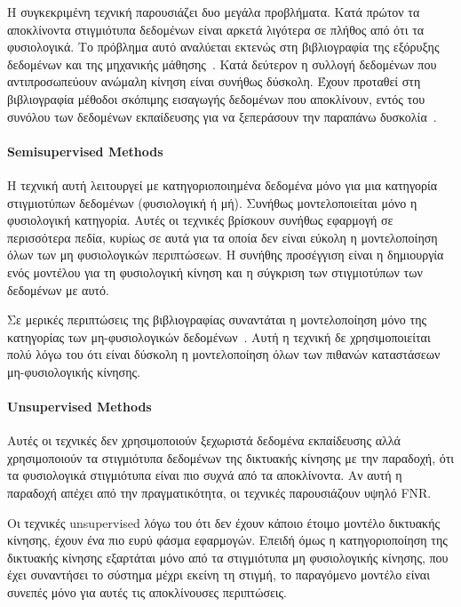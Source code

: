 \documentclass[12pt]{report}
\begin{document}
Η συγκεκριμένη τεχνική παρουσιάζει δυο μεγάλα προβλήματα. Κατά πρώτον τα αποκλίνοντα στιγμιότυπα δεδομένων είναι αρκετά λιγότερα σε πλήθος από ότι τα φυσιολογικά. Το πρόβλημα αυτό αναλύεται εκτενώς στη βιβλιογραφία της εξόρυξης δεδομένων και της μηχανικής μάθησης~\cite{paper:14}. Κατά δεύτερον η συλλογή δεδομένων που αντιπροσωπεύουν ανώμαλη κίνηση είναι συνήθως δύσκολη. Έχουν προταθεί στη βιβλιογραφία μέθοδοι σκόπιμης εισαγωγής δεδομένων που αποκλίνουν, εντός του συνόλου των δεδομένων εκπαίδευσης για να ξεπεράσουν την παραπάνω δυσκολία~\cite{paper:14}.

\paragraph{\textlatin{Semisupervised Methods}} Η τεχνική αυτή λειτουργεί με κατηγοριοποιημένα δεδομένα μόνο για μια κατηγορία στιγμιοτύπων δεδομένων (φυσιολογική ή μή). Συνήθως μοντελοποιείται μόνο η φυσιολογική κατηγορία. Αυτές οι τεχνικές βρίσκουν συνήθως εφαρμογή σε περισσότερα πεδία, κυρίως σε αυτά για τα οποία δεν είναι εύκολη η μοντελοποίηση όλων των μη φυσιολογικών περιπτώσεων. Η συνήθης προσέγγιση είναι η δημιουργία ενός μοντέλου για τη φυσιολογική κίνηση και η σύγκριση των στιγμιοτύπων των δεδομένων με αυτό.

Σε μερικές περιπτώσεις της βιβλιογραφίας συναντάται η μοντελοποίηση μόνο της κατηγορίας των μη-φυσιολογικών δεδομένων~\cite{paper:14}. Αυτή η τεχνική δε χρησιμοποιείται πολύ λόγω του ότι είναι δύσκολη η μοντελοποίηση όλων των πιθανών καταστάσεων μη-φυσιολογικής κίνησης.

\paragraph{\textlatin{Unsupervised Methods}} Αυτές οι τεχνικές δεν χρησιμοποιούν ξεχωριστά δεδομένα εκπαίδευσης αλλά χρησιμοποιούν τα στιγμιότυπα δεδομένων της δικτυακής κίνησης με την παραδοχή, ότι τα φυσιολογικά στιγμιότυπα είναι πιο συχνά από τα αποκλίνοντα. Αν αυτή η παραδοχή απέχει από την πραγματικότητα, οι τεχνικές παρουσιάζουν υψηλό \textlatin{FNR}.

Οι τεχνικές \textlatin{unsupervised} λόγω του ότι δεν έχουν κάποιο έτοιμο μοντέλο δικτυακής κίνησης, έχουν ένα πιο ευρύ φάσμα εφαρμογών. Επειδή όμως η κατηγοριοποίηση της δικτυακής κίνησης εξαρτάται μόνο από τα στιγμιότυπα μη φυσιολογικής κίνησης, που έχει συναντήσει το σύστημα μέχρι εκείνη τη στιγμή, το παραγόμενο μοντέλο είναι συνεπές μόνο για αυτές τις αποκλίνουσες περιπτώσεις.
\end{document}
